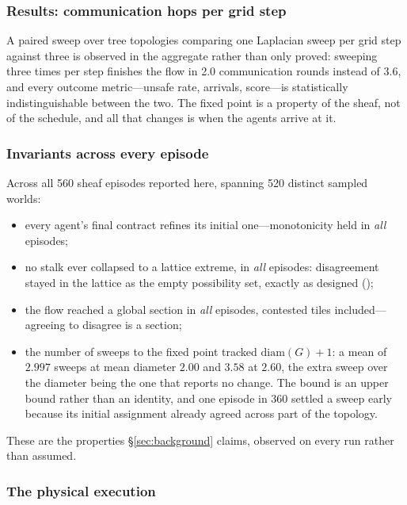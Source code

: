 \documentclass[11pt]{article}
\theoremstyle{definition}
\theoremstyle{remark}
\begin{document}
\subsubsection{Results: communication hops per grid step}
\label{sec:hops}

A paired sweep over tree topologies comparing one Laplacian sweep per grid step against three
is  observed in the aggregate rather than only proved: sweeping three times
per step finishes the flow in 2.0 communication rounds instead of 3.6, and every outcome
metric---unsafe rate, arrivals, score---is statistically indistinguishable between the two.
The fixed point is a property of the sheaf, not of the schedule, and all that changes is when
the agents arrive at it.

\subsubsection{Invariants across every episode}
\label{sec:invariants}

Across all 560 sheaf episodes reported here, spanning 520 distinct sampled worlds:

\begin{itemize}[nosep,leftmargin=1.4em]
\item every agent's final contract refines its initial one---monotonicity held in \emph{all}
  episodes;
\item no stalk ever collapsed to a lattice extreme, in \emph{all} episodes: disagreement stayed
  in the lattice as the empty possibility set, exactly as designed ();
\item the flow reached a global section in \emph{all} episodes, contested tiles included---
  agreeing to disagree is a section;
\item the number of sweeps to the fixed point tracked $\mathrm{diam}(G) + 1$: a mean of $2.997$
  sweeps at mean diameter $2.00$ and $3.58$ at $2.60$, the extra sweep over the diameter being
  the one that reports no change.
  The bound is an upper bound rather than an identity, and one episode in 360 settled a sweep
  early because its initial assignment already agreed across part of the topology.
\end{itemize}

These are the properties \S\ref{sec:background} claims, observed on every run rather than
assumed.

\subsubsection{The physical execution}
\label{sec:hardware-gap}
\end{document}

